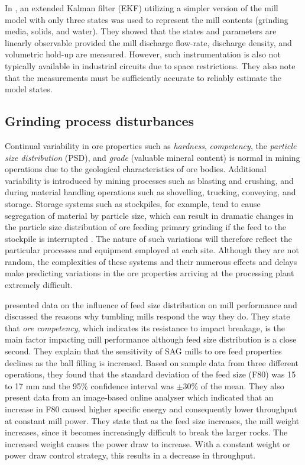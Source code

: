 In \cite{le_roux_ekf_2017}, an extended Kalman filter (\gls{EKF}) utilizing a simpler version of the mill model with only three states was used to represent the mill contents (grinding media, solids, and water). They showed that the states and parameters are linearly observable provided the mill discharge flow-rate, discharge density, and volumetric hold-up are measured. However, such instrumentation is also not typically available in industrial circuits due to space restrictions. They also note that the measurements must be sufficiently accurate to reliably estimate the model states.

\subsection{Grinding process disturbances}

Continual variability in ore properties such as \textit{hardness}, \textit{competency}, the \textit{particle size distribution} (\gls{PSD}), and \textit{grade} (valuable mineral content) is normal in mining operations due to the geological characteristics of ore bodies. Additional variability is introduced by mining processes such as blasting and crushing, and during material handling operations such as shovelling, trucking, conveying, and storage. Storage systems such as stockpiles, for example, tend to cause segregation of material by particle size, which can result in dramatic changes in the particle size distribution of ore feeding primary grinding if the feed to the stockpile is interrupted \citep{estrada_hybrid_2014}. The nature of such variations will therefore reflect the particular processes and equipment employed at each site. Although they are not random, the complexities of these systems and their numerous effects and delays make predicting variations in the ore properties arriving at the processing plant extremely difficult.

\cite{morrell_influence_2001} presented data on the influence of feed size distribution on mill performance and discussed the reasons why tumbling mills respond the way they do. They state that \textit{ore competency}, which indicates its resistance to impact breakage, is the main factor impacting mill performance although feed size distribution is a close second. They explain that the sensitivity of \gls{SAG} mills to ore feed properties declines as the ball filling is increased. Based on sample data from three different operations, they found that the standard deviation of the feed size (F80) was 15 to 17 mm and the 95\% confidence interval was $\pm30\text{\%}$ of the mean. They also present data from an image-based online analyser which indicated that an increase in F80 caused higher specific energy and consequently lower throughput at constant mill power. They state that as the feed size increases, the mill weight increases, since it becomes increasingly difficult to break the larger rocks. The increased weight causes the power draw to increase. With a constant weight or power draw control strategy, this results in a decrease in throughput.

